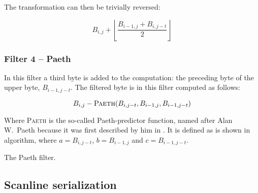 The transformation can then be trivially reversed:

\begin{equation*}
  B_{i,j} + \left \lfloor \frac{B_{i-1,j} +
      B_{i,j-t}}{2} \right \rfloor
\end{equation*}

\subsubsection{Filter 4 -- Paeth}

In this filter a third byte is added to the computation: the preceding
byte of the upper byte, $B_{i-1,j-t}$. The filtered byte is in this
filter computed as follows:

\begin{equation*}
  B_{i,j} - \textsc{Paeth}(B_{i,j-t},B_{i-1,j},B_{i-1,j-t})
\end{equation*}

Where \textsc{Paeth} is the so-called Paeth-predictor function, named
after Alan W.~Paeth because it was first described by him in
\cite{arvo1994graphics_gems}. It is defined as is shown in algorithm,
where $a=B_{i,j-t}$, $b=B_{i-1,j}$ and $c=B_{i-1,j-t}$.


\begin{algorithm}[H]
  \caption{The Paeth filter.}
  \label{alg:paeth}
  \begin{algorithmic}[1]
    \State {}
    \State {}
    \Else
    \State {}
    \EndIf
    \EndProcedure
  \end{algorithmic}
\end{algorithm}

\subsection{Scanline serialization}

\newcommand{\checkerimg}{
  \tikz[scale=2]{
    \fill[gray] (0,0) rectangle (0.5ex,0.5ex);
    \fill[black] (0.5ex,0) rectangle (1.0ex,0.5ex);
    \fill[black] (0,0.5ex) rectangle (0.5ex,1.0ex);
    \fill[gray] (0.5ex,0.5ex) rectangle (1.0ex,1.0ex);
  }}


